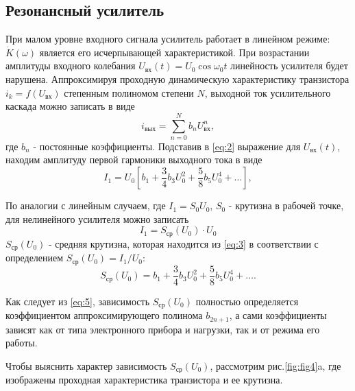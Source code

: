 \subsection{Резонансный усилитель}
При малом уровне входного сигнала усилитель работает в линейном режиме: $\dot{K}(\omega)$ является его исчерпывающей характеристикой.
При возрастании амплитуды входного колебания $U_\text{вх}(t)=U_0\cos \omega_0 t$ линейность усилителя будет нарушена. Аппроксимируя проходную динамическую характеристику транзистора $i_k=f(U_\text{вх})$ степенным полиномом степени $N$, выходной ток усилительного каскада можно записать в виде
\begin{equation}
i_\text{вых}=\sum\limits_{n=0}^{N}b_n U^n_\text{вх},
\label{eq:2}
\end{equation}
где $b_n$ - постоянные коэффициенты.
Подставив в \eqref{eq:2} выражение для $U_\text{вх}(t)$, находим амплитуду первой гармоники выходного тока в виде
\begin{equation}
I_1=U_0[b_1+\frac{3}{4}b_3U_0^2+\frac{5}{8}b_5U_0^4+\ldots],
\label{eq:3}
\end{equation}

По аналогии с линейным случаем, где $I_1=S_0U_0$, $S_0$ - крутизна в рабочей точке, для нелинейного усилителя можно записать 
\begin{equation}
I_1=S_\text{ср}(U_0)\cdot U_0
\label{eq:4}
\end{equation}
$S_\text{ср}(U_0)$ - средняя крутизна, которая находится из \eqref{eq:3} в соответствии с определением $S_\text{ср}(U_0)=I_1/U_0$:
\begin{equation}
S_\text{ср}(U_0)=b_1+\frac{3}{4}b_3U_0^2+\frac{5}{8}b_5U_0^4+\ldots.
\label{eq:5}
\end{equation}

Как следует из \eqref{eq:5}, зависимость $S_\text{ср}(U_0)$ полностью определяется коэффициентом аппроксимирующего полинома $b_{2n+1}$, а сами коэффициенты зависят как от типа электронного прибора и нагрузки, так и от режима его работы.

Чтобы выяснить характер зависимость $S_\text{ср}(U_0)$, рассмотрим рис.\ref{fig:fig4}a, где изображены проходная характеристика транзистора и ее крутизна.

